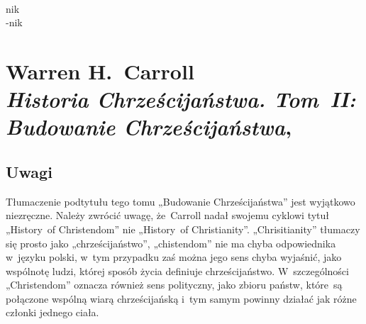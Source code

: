 \documentclass[a4paper,11pt]{article}
\begin{document}
\begin{center}
\begin{tabular}{|c|c|c|c|c|}
    \hline
  \end{tabular}

\end{center}

\VerSpaceSix


\noindent
{} \\
\Jest \hspace{5pt} nik \\
\Powin -nik \\











\section{ %
  Warren H.~Carroll \\
  \textit{Historia Chrześcijaństwa. Tom~II: Budowanie Chrześcijaństwa},
  \cite{CarrollHistoriaChrzecijanstwaVolII2010}}



\subsection{Uwagi}



\noindent
Tłumaczenie podtytułu tego tomu „Budowanie Chrześcijaństwa” jest wyjątkowo
niezręczne. Należy zwrócić uwagę, że~Carroll nadał swojemu cyklowi tytuł
„History~of Christendom” nie „History~of Christianity”. „Chrisitianity”
tłumaczy się prosto jako „chrześcijaństwo”, „chistendom” nie ma chyba
odpowiednika w~języku polski, w~tym przypadku zaś można jego sens chyba
wyjaśnić, jako wspólnotę ludzi, której sposób życia definiuje
chrześcijaństwo. W~szczególności „Christendom” oznacza również sens
polityczny, jako zbioru państw, które~są połączone wspólną wiarą
chrześcijańską i~tym samym powinny działać jak różne członki jednego ciała.
\end{document}
